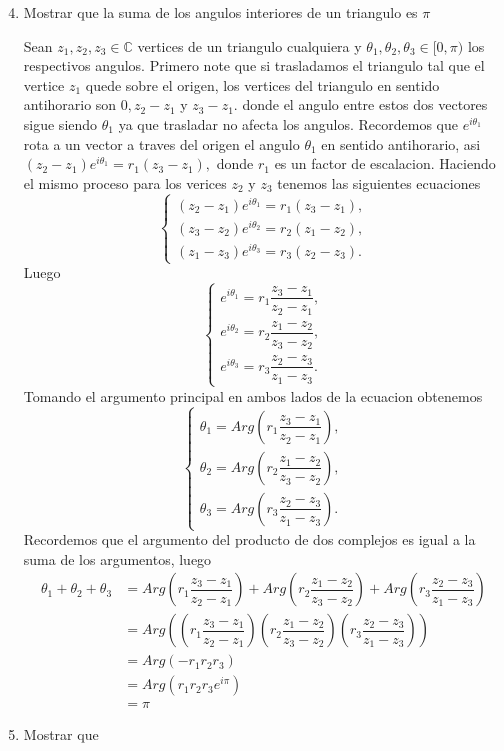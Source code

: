 \documentclass[11pt]{article}
\begin{document}
\begin{enumerate}
  \setcounter{enumi}{3}
  \item Mostrar que la suma de los angulos interiores de un triangulo es $\pi$

  Sean $z_1,z_2,z_3\in \mathbb{C}$ vertices de un triangulo cualquiera y $\theta_1,\theta_2,\theta_3\in[0,\pi)$ los respectivos angulos. Primero note que si trasladamos el triangulo tal que el vertice $z_1$ quede sobre el origen, los vertices del triangulo en sentido antihorario son $0,z_2-z_1$ y $z_3-z_1.$ donde el angulo entre estos dos vectores sigue siendo $\theta_1$ ya que trasladar no afecta los angulos. Recordemos que $e^{i\theta_1}$ rota a un vector a traves del origen el angulo $\theta_1$ en sentido antihorario, asi $(z_2-z_1)e^{i\theta_1}=r_1(z_3-z_1),$ donde $r_1$ es un factor de escalacion. Haciendo el mismo proceso para los verices $z_2$ y $z_3$ tenemos las siguientes ecuaciones
  $$\begin{cases}
    (z_2-z_1)e^{i\theta_1}=r_1(z_3-z_1),\\
    (z_3-z_2)e^{i\theta_2}=r_2(z_1-z_2),\\
    (z_1-z_3)e^{i\theta_3}=r_3(z_2-z_3).
  \end{cases}$$
  Luego 
  $$\begin{cases}
    e^{i\theta_1}=r_1\dfrac{z_3-z_1}{z_2-z_1},\\
    e^{i\theta_2}=r_2\dfrac{z_1-z_2}{z_3-z_2},\\
    e^{i\theta_3}=r_3\dfrac{z_2-z_3}{z_1-z_3}.
  \end{cases}$$
  Tomando el argumento principal en ambos lados de la ecuacion obtenemos
  $$\begin{cases}
    \theta_1=Arg\left(r_1\dfrac{z_3-z_1}{z_2-z_1}\right),\\
    \theta_2=Arg\left(r_2\dfrac{z_1-z_2}{z_3-z_2}\right),\\
    \theta_3=Arg\left(r_3\dfrac{z_2-z_3}{z_1-z_3}\right).
  \end{cases}$$
  Recordemos que el argumento del producto de dos complejos es igual a la suma de los argumentos, luego
  \begin{align*}
    \theta_1+\theta_2+\theta_3&=Arg\left(r_1\dfrac{z_3-z_1}{z_2-z_1}\right)+Arg\left(r_2\dfrac{z_1-z_2}{z_3-z_2}\right)+Arg\left(r_3\dfrac{z_2-z_3}{z_1-z_3}\right)\\
    &=Arg\left(\left(r_1\dfrac{z_3-z_1}{z_2-z_1}\right)\left(r_2\dfrac{z_1-z_2}{z_3-z_2}\right)\left(r_3\dfrac{z_2-z_3}{z_1-z_3}\right)\right)\\
    &=Arg(-r_1r_2r_3)\\
    &=Arg(r_1r_2r_3e^{i\pi})\\
    &=\pi
  \end{align*}

  \item Mostrar que
\end{enumerate}
\end{document}
